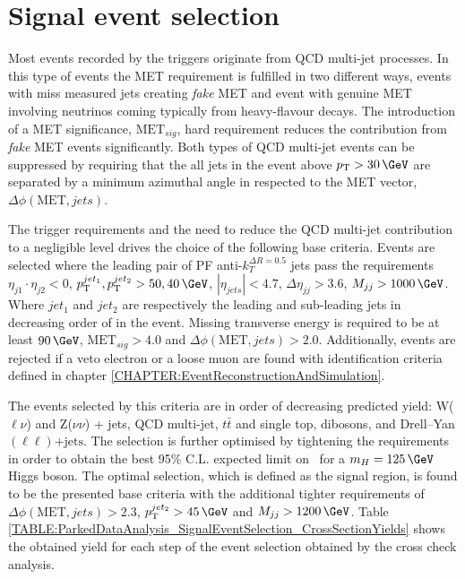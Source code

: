 \section{Signal event selection}
\label{SECTION:ParkedDataAnalysis_SignalEventSelection}


Most events recorded by the triggers originate from \gls{QCD} multi-jet processes. In this type of events the \gls{MET} requirement is fulfilled in two different ways, events with miss measured jets creating \textit{fake} \gls{MET} and event with genuine \gls{MET} involving neutrinos coming typically from heavy-flavour decays. The introduction of a \gls{MET} significance, $\text{MET}_{sig}$, hard requirement reduces the contribution from \textit{fake} \gls{MET} events significantly. Both types of \gls{QCD} multi-jet events can be suppressed by requiring that the all jets in the event above $\pt>30\,\GeV$ are separated by a minimum azimuthal angle in respected to the \gls{MET} vector, $\Delta\phi(\text{MET},jets)$.

The trigger requirements and the need to reduce the \gls{QCD} multi-jet contribution to a negligible level drives the choice of the following base criteria. Events are selected where the leading pair of \gls{PF} anti-$k_T^{\Delta R=0.5}$ jets pass the requirements $\eta_{j1} \cdot \eta_{j2}<0$, $\pt^{jet_1},\pt^{jet_2} > 50,40\,\GeV$, $|\eta_{jets}| < 4.7$, $\Delta\eta_{jj}>3.6$, $M_{jj}>1000\,\GeV$.  Where $jet_1$ and $jet_2$ are respectively the leading and sub-leading jets in decreasing order of \pt in the event. Missing transverse energy is required to be at least $90\,\GeV$, $\text{MET}_{sig}>4.0$ and $\Delta\phi(\text{MET},jets)>2.0$. Additionally, events are rejected if a veto electron or a loose muon are found with identification criteria defined in chapter \ref{CHAPTER:EventReconstructionAndSimulation}.

The events selected by this criteria are in order of decreasing predicted yield: W($\ell\nu$) and Z($\nu\nu$) + jets, \gls{QCD} multi-jet, $t\bar{t}$ and single top, dibosons, and Drell--Yan$(\ell\ell)\text{+jets}$. The selection is further optimised by tightening the requirements in order to obtain the best 95\% C.L. expected limit on \BRinv\, for a $m_H=125\,\GeV$ Higgs boson. The optimal selection, which is defined as the signal region, is found to be the presented base criteria with the additional tighter requirements of $\Delta\phi(\text{MET},jets)>2.3$, $\pt^{jet_2}>45\,\GeV$ and $M_{jj}>1200\,\GeV$. Table \ref{TABLE:ParkedDataAnalysis_SignalEventSelection_CrossSectionYields} shows the obtained yield for each step of the event selection obtained by the cross check analysis.

